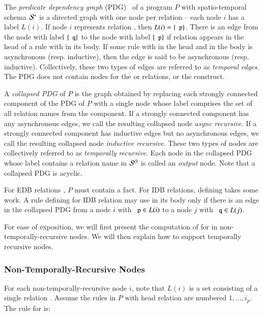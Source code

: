 The {\em predicate dependency graph} (PDG)~\cite{ullmanbook} of a \slang program $P$ with spatio-temporal schema $\mathcal{S}^*$ is a directed graph with one node per relation -- each node $i$ has a label $L(i)$.  If node $i$ represents relation , then $L(i) = \{\dedalus{p}\}$.  There is an edge from the node with label $\{\dedalus{q}\}$ to the node with label $\{\dedalus{p}\}$ if relation  appears in the head of a rule with  in its body.  If some rule with  in the head and  in the body is asynchronous (resp. inductive), then the edge is said to be asynchronous (resp. inductive).  Collectively, these two types of edges are referred to as {\em temporal edges}.  The PDG does not contain nodes for the  or  relations, or the  construct.

A {\em collapsed PDG} of $P$ is the graph obtained by replacing each strongly
connected component of the PDG of $P$ with a single node whose label comprises
the set of all relation names from the component.  If a strongly connected
component has any asynchronous edges, we call the resulting collapsed node {\em
  async recursive}.  If a strongly connected component has inductive edges but
no asynchronous edges, we call the resulting collapsed node {\em inductive
  recursive}.  These two types of nodes are collectively referred to as {\em
  temporally recursive}.  Each node in the collapsed PDG whose label contains a
relation name in $\mathcal{S}^O$ is called an {\em output} node.  Note that a
collapsed PDG is acyclic.

For EDB relations , $P$ must contain a  fact.  For
IDB relations, defining  takes some work.  A rule defining
 for IDB relation  may use  in
its body only if there is an edge in the collapsed PDG from a node $i$ with
$\dedalus{p} \in L(i)$ to a node $j$ with $\dedalus{q} \in L(j)$.

For ease of exposition, we will first present the computation of  for  in non-temporally-recursive nodes.  We will then explain how to support temporally recursive nodes.

\subsubsection{Non-Temporally-Recursive Nodes}

For each non-temporally-recursive node $i$, note that $L(i)$ is a set consisting
of a single relation .  Assume the rules in $P$ with head relation
 are numbered $1, \ldots, i_p$.  The rule for 
is:

